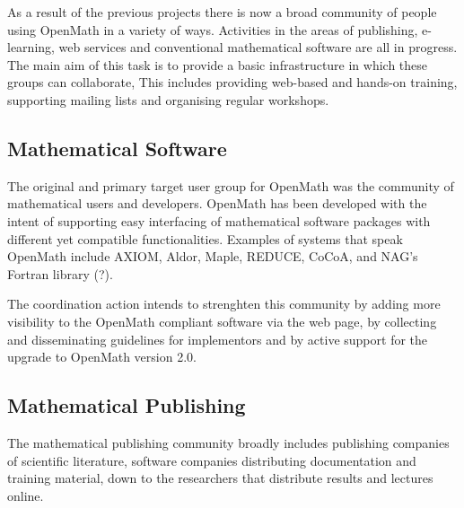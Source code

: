 \documentclass[draft]{artikel3}
\begin{document}



As a result of the previous projects there is now a broad community of
people using OpenMath in a variety of ways.  Activities in the areas
of publishing, e-learning, web services and conventional mathematical
software are all in progress.  The main aim of this task is to provide
a basic infrastructure in which these groups can collaborate, This
includes providing web-based and hands-on training, supporting mailing
lists and organising regular workshops.

\subsection{Mathematical Software}
\label{sec:msw}

The original and primary target user group for OpenMath was the
community of mathematical users and developers. OpenMath has been
developed with the intent of supporting easy interfacing of
mathematical software packages with different yet compatible
functionalities. Examples of systems that speak OpenMath include
AXIOM, Aldor, Maple, REDUCE, CoCoA, and NAG's Fortran library (?).

The coordination action intends to strenghten this community by adding
more visibility to the OpenMath compliant software via the web page,
by collecting and disseminating guidelines for implementors and by
active support for the upgrade to OpenMath version 2.0.

\subsection{Mathematical Publishing}
\label{sec:mpubl}

The mathematical publishing community broadly includes publishing
companies of scientific literature, software companies distributing
documentation and training material, down to the researchers that
distribute results and lectures online.
\end{document}
